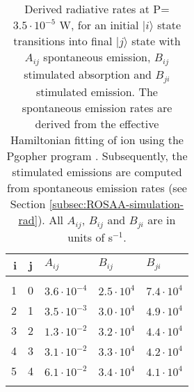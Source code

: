 \begin{table}[!htb]
    \centering
    \caption{Derived radiative rates at P=$3.5 \cdot 10^{-5}$ W, for an initial $|i\rangle$ state transitions into final $|j\rangle$ state with $A_{ij}$ spontaneous emission, $B_{ij}$ stimulated absorption and $B_{ji}$ stimulated emission. The spontaneous emission rates are derived from the effective Hamiltonian fitting of \CD ion using the Pgopher program \cite{western_pgopher_2017}. Subsequently, the stimulated emissions are computed from spontaneous emission rates (see Section \ref{subsec:ROSAA-simulation-rad}). All $A_{ij}$, $B_{ij}$ and $B_{ji}$ are in units of s$^{-1}$.}
    \label{appendix:tab:radiative-rate-coefficients}
    \begin{tabular}{rclll}
        \hline
        i & j & $A_{ij}$            & $B_{ij}$           & $B_{ji}$           \\
        \hline\hline                                                          \\
        1 & 0 & $3.6 \cdot 10^{-4}$ & $2.5 \cdot 10^{4}$ & $7.4 \cdot 10^{4}$ \\
        2 & 1 & $3.5 \cdot 10^{-3}$ & $3.0 \cdot 10^{4}$ & $4.9 \cdot 10^{4}$ \\
        3 & 2 & $1.3 \cdot 10^{-2}$ & $3.2 \cdot 10^{4}$ & $4.4 \cdot 10^{4}$ \\
        4 & 3 & $3.1 \cdot 10^{-2}$ & $3.3 \cdot 10^{4}$ & $4.2 \cdot 10^{4}$ \\
        5 & 4 & $6.1 \cdot 10^{-2}$ & $3.4 \cdot 10^{4}$ & $4.1 \cdot 10^{4}$ \\
        \hline\hline                                                          \\
    \end{tabular}
\end{table}

